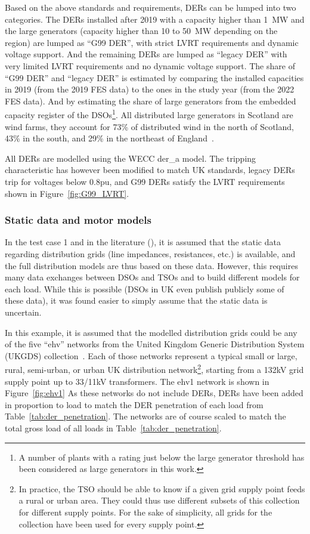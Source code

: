 Based on the above standards and requirements, DERs can be lumped into two categories. The DERs installed after 2019 with a capacity higher than 1~MW and the large generators (capacity higher than 10 to 50~MW depending on the region) are lumped as ``G99 DER'', with strict LVRT requirements and dynamic voltage support. And the remaining DERs are lumped as ``legacy DER'' with very limited LVRT requirements and no dynamic voltage support. The share of ``G99 DER'' and ``legacy DER'' is estimated by comparing the installed capacities in 2019 (from the 2019 FES data) to the ones in the study year (from the 2022 FES data). And by estimating the share of large generators from the embedded capacity register of the DSOs\footnote{A number of plants with a rating just below the large generator threshold has been considered as large generators in this work.}. All distributed large generators in Scotland are wind farms, they account for 73\% of distributed wind in the north of Scotland, 43\% in the south, and 29\% in the northeast of England~\cite{capacity_register_northern_powergrid, capacity_register_ssen, capacity_register_sp}.

All DERs are modelled using the WECC der\_a model. The tripping characteristic has however been modified to match UK standards, \ie legacy DERs trip for voltages below 0.8pu, and G99 DERs satisfy the LVRT requirements shown in Figure~\ref{fig:G99_LVRT}.

\subsubsection{Static data and motor models}
\label{sec:CIGRE_distrib_static}

In the test case 1 and in the literature (\eg \cite{ChaspierrePaper, ChaspierreThesis, Vorwerk}), it is assumed that the static data regarding distribution grids (line impedances, resistances, etc.) is available, and the full distribution models are thus based on these data. However, this requires many data exchanges between DSOs and TSOs and to build different models for each load. While this is possible (DSOs in UK even publish publicly some of these data), it was found easier to simply assume that the static data is uncertain.

In this example, it is assumed that the modelled distribution grids could be any of the five ``ehv'' networks from the United Kingdom Generic Distribution System (UKGDS) collection~\cite{UKGDS}. Each of those networks represent a typical small or large, rural, semi-urban, or urban UK distribution network\footnote{In practice, the TSO should be able to know if a given grid supply point feeds a rural or urban area. They could thus use different subsets of this collection for different supply points. For the sake of simplicity, all grids for the collection have been used for every supply point.}, starting from a 132kV grid supply point up to 33/11kV transformers. The ehv1 network is shown in Figure~\ref{fig:ehv1} As these networks do not include DERs, DERs have been added in proportion to load to match the DER penetration of each load from Table~\ref{tab:der_penetration}. The networks are of course scaled to match the total gross load of all loads in Table~\ref{tab:der_penetration}.

